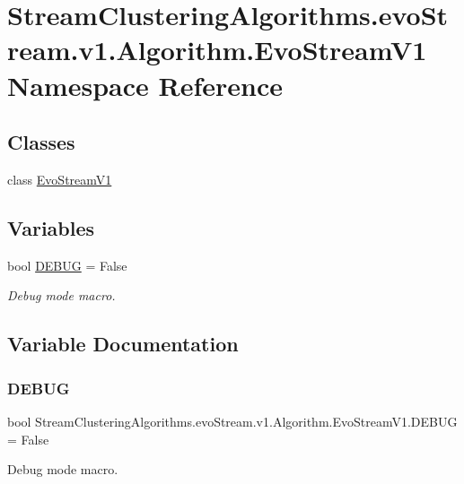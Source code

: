 \hypertarget{namespaceStreamClusteringAlgorithms_1_1evoStream_1_1v1_1_1Algorithm_1_1EvoStreamV1}{}\section{Stream\+Clustering\+Algorithms.\+evo\+Stream.\+v1.\+Algorithm.\+Evo\+Stream\+V1 Namespace Reference}
\label{namespaceStreamClusteringAlgorithms_1_1evoStream_1_1v1_1_1Algorithm_1_1EvoStreamV1}
\subsection*{Classes}
\begin{DoxyCompactItemize}
\item 
class \hyperlink{classStreamClusteringAlgorithms_1_1evoStream_1_1v1_1_1Algorithm_1_1EvoStreamV1_1_1EvoStreamV1}{Evo\+Stream\+V1}
\end{DoxyCompactItemize}
\subsection*{Variables}
\begin{DoxyCompactItemize}
\item 
bool \hyperlink{namespaceStreamClusteringAlgorithms_1_1evoStream_1_1v1_1_1Algorithm_1_1EvoStreamV1_a53c06b8f62c7d304ac259e90936eabb0}{D\+E\+B\+UG} = False
\begin{DoxyCompactList}\small\item\em Debug mode macro. \end{DoxyCompactList}\end{DoxyCompactItemize}


\subsection{Variable Documentation}
\mbox{\label{namespaceStreamClusteringAlgorithms_1_1evoStream_1_1v1_1_1Algorithm_1_1EvoStreamV1_a53c06b8f62c7d304ac259e90936eabb0}} 
\subsubsection{\texorpdfstring{D\+E\+B\+UG}{DEBUG}}
{\footnotesize\ttfamily bool Stream\+Clustering\+Algorithms.\+evo\+Stream.\+v1.\+Algorithm.\+Evo\+Stream\+V1.\+D\+E\+B\+UG = False}



Debug mode macro. 

